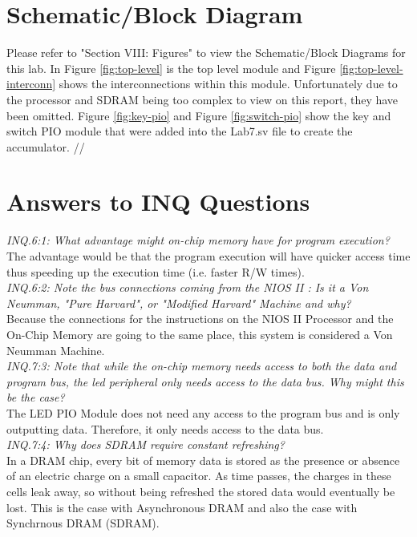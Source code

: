 \documentclass[journal, twocolumn, final,11pt,letterpaper]{IEEEtran}
\begin{document}
\section{Schematic/Block Diagram}

Please refer to "Section VIII: Figures" to view the Schematic/Block Diagrams for this lab. In Figure \ref{fig:top-level} is the top level module and Figure \ref{fig:top-level-interconn} shows the interconnections within this module. Unfortunately due to the processor and SDRAM being too complex to view on this report, they have been omitted. Figure \ref{fig:key-pio} and Figure \ref{fig:switch-pio} show the key and switch PIO module that were added into the Lab7.sv file to create the accumulator. //

\section{Answers to INQ Questions}
\textit{INQ.6:1: What advantage might on-chip memory have for program execution?} \\

The advantage would be that the program execution will have quicker access time thus speeding up the execution time (i.e. faster R/W times). \\

\textit{INQ.6:2: Note the bus connections coming from the NIOS II : Is it a Von Neumman, "Pure Harvard", or "Modified Harvard" Machine and why?} \\

Because the connections for the instructions on the NIOS II Processor and the On-Chip Memory are going to the same place, this system is considered a Von Neumman Machine. \\

\textit{INQ.7:3: Note that while the on-chip memory needs access to both the data and program bus, the led peripheral only needs access to the data bus. Why might this be the case?} \\

The LED PIO Module does not need any access to the program bus and is only outputting data. Therefore, it only needs access to the data bus. \\

\textit{INQ.7:4: Why does SDRAM require constant refreshing?} \\

In a DRAM chip, every bit of memory data is stored as the presence or absence of an electric charge on a small capacitor. As time passes, the charges in these cells leak away, so without being refreshed the stored data would eventually be lost. This is the case with Asynchronous DRAM and also the case with Synchrnous DRAM (SDRAM). \\
\end{document}
